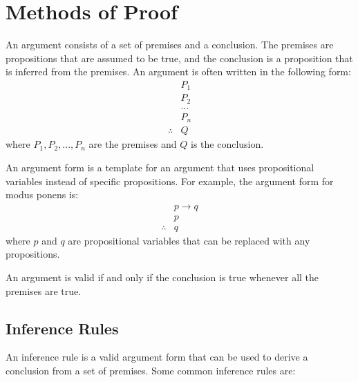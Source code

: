 \chapter{Methods of Proof}
\begin{definition}[Argument]
    An argument consists of a set of premises and a conclusion. The premises are propositions that are assumed to be true, and the conclusion is a proposition that is inferred from the premises. An argument is often written in the following form:
    \[
        \begin{array}{rl}
            & P_1 \\
            & P_2 \\
            & ... \\
            & P_n \\
            \hline
            \therefore & Q
        \end{array}
    \]
    where $P_1, P_2, ..., P_n$ are the premises and $Q$ is the conclusion.
\end{definition}

\begin{definition}
    An argument form is a template for an argument that uses propositional variables instead of specific propositions. For example, the argument form for modus ponens is:
    \[
        \begin{array}{rl}
            & p \to q \\
            & p \\
            \hline
            \therefore & q
        \end{array}
    \]
    where $p$ and $q$ are propositional variables that can be replaced with any propositions.
\end{definition}

\begin{definition}
    An argument is valid if and only if the conclusion is true whenever all the premises are true.
\end{definition}

    

\section{Inference Rules}
\begin{definition}
    An inference rule is a valid argument form that can be used to derive a conclusion from a set of premises. Some common inference rules are:
\end{definition}

